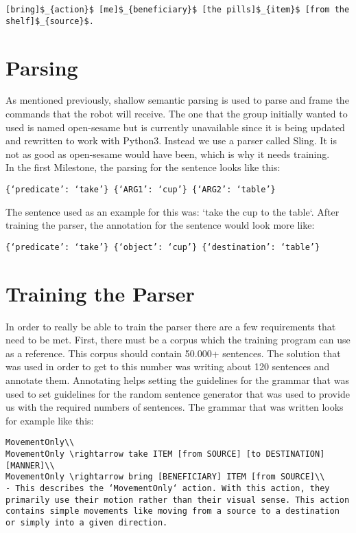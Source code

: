 \documentclass[main.tex]{subfiles}
\begin{document}
\begin{verbatim}
[bring]$_{action}$ [me]$_{beneficiary}$ [the pills]$_{item}$ [from the shelf]$_{source}$.
\end{verbatim}
	
	\section{Parsing}
	As mentioned previously, shallow semantic parsing is used to parse and frame the commands that the robot will receive. The one that the group initially wanted to used is named open-sesame but is currently unavailable since it is being updated and rewritten to work with Python3. Instead we use a parser called Sling. It is not as good as open-sesame would have been, which is why it needs training.\\ 
In the first Milestone, the parsing for the sentence looks like this:

\begin{verbatim}
{‘predicate’: ‘take’} {‘ARG1’: ‘cup’} {‘ARG2’: ‘table’}
\end{verbatim}

The sentence used as an example for this was: ‘take the cup to the table‘. After training the parser, the annotation for the sentence would look more like:

\begin{verbatim}
{‘predicate’: ‘take’} {‘object’: ‘cup’} {‘destination’: ‘table’}
\end{verbatim}
	
	\section{Training the Parser}
	In order to really be able to train the parser there are a few requirements that need to be met. First, there must be a corpus which the training program can use as a reference. This corpus should contain 50.000+ sentences. The solution that was used in order to get to this number was writing about 120 sentences and annotate them. Annotating helps setting the guidelines for the grammar that was used to set guidelines for the random sentence generator that was used to provide us with the required numbers of sentences.
The grammar that was written looks for example like this:

\begin{verbatim}
MovementOnly\\
MovementOnly \rightarrow take ITEM [from SOURCE] [to DESTINATION] [MANNER]\\
MovementOnly \rightarrow bring [BENEFICIARY] ITEM [from SOURCE]\\
- This describes the ‘MovementOnly‘ action. With this action, they primarily use their motion rather than their visual sense. This action contains simple movements like moving from a source to a destination or simply into a given direction.
\end{verbatim}
\end{document}
